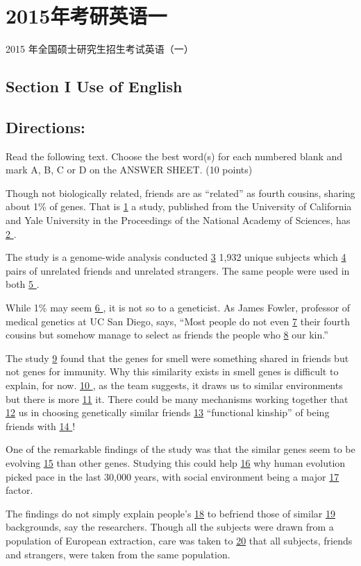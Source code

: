 \documentclass[UTF8,11pt]{ctexart}
\begin{document}
\section*{2015年考研英语一}
2015 年全国硕士研究生招生考试英语（一）


\subsection*{\textbf{Section I Use of English}}


\subsection*{\textbf{Directions:}}


Read the following text. Choose the best word(s) for each numbered blank and mark A, B, C or D on the ANSWER SHEET. (10 points)


Though not biologically related, friends are as “related” as fourth cousins, sharing about 1\% of genes. That is \uline{1} a study, published from the University of California and Yale University in the Proceedings of the National Academy of Sciences, has \uline{2 }.


The study is a genome-wide analysis conducted \uline{3} 1,932 unique subjects which \uline{4} pairs of unrelated friends and unrelated strangers. The same people were used in both \uline{5 }.


While 1\% may seem \uline{6 }, it is not so to a geneticist. As James Fowler, professor of medical genetics at UC San Diego, says, “Most people do not even \uline{7} their fourth cousins but somehow manage to select as friends the people who \uline{8} our kin.”


The study \uline{9} found that the genes for smell were something shared in friends but not genes for immunity. Why this similarity exists in smell genes is difficult to explain, for now. \uline{10 }, as the team suggests, it draws us to similar environments but there is more \uline{11} it. There could be many mechanisms working together that \uline{12} us in choosing genetically similar friends \uline{13} “functional kinship” of being friends with \uline{14 }!


One of the remarkable findings of the study was that the similar genes seem to be evolving \uline{15} than other genes. Studying this could help \uline{16} why human evolution picked pace in the last 30,000 years, with social environment being a major \uline{17} factor.


The findings do not simply explain people’s \uline{18} to befriend those of similar \uline{19} backgrounds, say the researchers. Though all the subjects were drawn from a population of European extraction, care was taken to \uline{20} that all subjects, friends and strangers, were taken from the same population.
\end{document}
